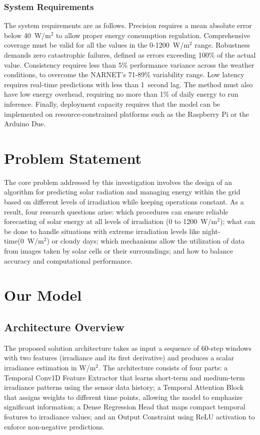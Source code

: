 \documentclass[journal]{IEEEtran}
\begin{document}
\subsubsection{System Requirements}
The system requirements are as follows. Precision requires a mean absolute error below 40~W/m$^2$ to allow proper energy consumption regulation. Comprehensive coverage must be valid for all the values in the 0-1200~W/m$^2$ range. Robustness demands zero catastrophic failures, defined as errors exceeding 100\% of the actual value. Consistency requires less than 5\% performance variance across the weather conditions, to overcome the NARNET's 71-89\% variability range. Low latency requires real-time predictions with less than 1~second lag. The method must also have low energy overhead, requiring no more than 1\% of daily energy to run inference. Finally, deployment capacity requires that the model can be implemented on resource-constrained platforms such as the Raspberry Pi or the Arduino Due.

\section{Problem Statement}
The core problem addressed by this investigation involves the design of an algorithm for predicting solar radiation and managing energy within the grid based on different levels of irradiation while keeping operations constant. As a result, four research questions arise: which procedures can ensure reliable forecasting of solar energy at all levels of irradiation (0 to 1200~W/m$^2$); what can be done to handle situations with extreme irradiation levels like night-time(0~W/m$^2$) or cloudy days; which mechanisms allow the utilization of data from images taken by solar cells or their surroundings; and how to balance accuracy and computational performance.

\section{Our Model}

\subsection{Architecture Overview}
The proposed solution architecture takes as input a sequence of 60-step windows with two features (irradiance and its first derivative) and produces a scalar irradiance estimation in W/m$^2$. The architecture consists of four parts: a Temporal Conv1D Feature Extractor that learns short-term and medium-term irradiance patterns using the sensor data history; a Temporal Attention Block that assigns weights to different time points, allowing the model to emphasize significant information; a Dense Regression Head that maps compact temporal features to irradiance values; and an Output Constraint using ReLU activation to enforce non-negative predictions.
\end{document}

